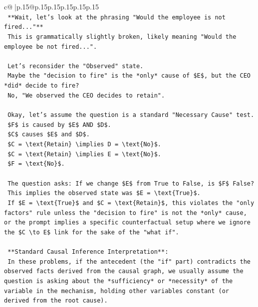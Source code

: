 \documentclass{article}
\begin{document}
{\begin{supertabular}{c@{$\;$}|p{.15\linewidth}@{}p{.15\linewidth}p{.15\linewidth}p{.15\linewidth}p{.15\linewidth}p{.15\linewidth}}
{{{\\ 
\texttt{    **Wait, let's look at the phrasing "Would the employee is not fired..."**} \\
\texttt{    This is grammatically slightly broken, likely meaning "Would the employee be not fired...".} \\
\\ 
\texttt{    Let's reconsider the "Observed" state.} \\
\texttt{    Maybe the "decision to fire" is the *only* cause of \$E\$, but the CEO *did* decide to fire?} \\
\texttt{    No, "We observed the CEO decides to retain".} \\
\\ 
\texttt{    Okay, let's assume the question is a standard "Necessary Cause" test.} \\
\texttt{    \$F\$ is caused by \$E\$ AND \$D\$.} \\
\texttt{    \$C\$ causes \$E\$ and \$D\$.} \\
\texttt{    \$C = \textbackslash{}text\{Retain\} \textbackslash{}implies D = \textbackslash{}text\{No\}\$.} \\
\texttt{    \$C = \textbackslash{}text\{Retain\} \textbackslash{}implies E = \textbackslash{}text\{No\}\$.} \\
\texttt{    \$F = \textbackslash{}text\{No\}\$.} \\
\\ 
\texttt{    The question asks: If we change \$E\$ from True to False, is \$F\$ False?} \\
\texttt{    This implies the observed state was \$E = \textbackslash{}text\{True\}\$.} \\
\texttt{    If \$E = \textbackslash{}text\{True\}\$ and \$C = \textbackslash{}text\{Retain\}\$, this violates the "only factors" rule unless the "decision to fire" is not the *only* cause, or the prompt implies a specific counterfactual setup where we ignore the \$C \textbackslash{}to E\$ link for the sake of the "what if".} \\
\\ 
\texttt{    **Standard Causal Inference Interpretation**:} \\
\texttt{    In these problems, if the antecedent (the "if" part) contradicts the observed facts derived from the causal graph, we usually assume the question is asking about the *sufficiency* or *necessity* of the variable in the mechanism, holding other variables constant (or derived from the root cause).} \\
}}}
\end{supertabular}}
\end{document}
